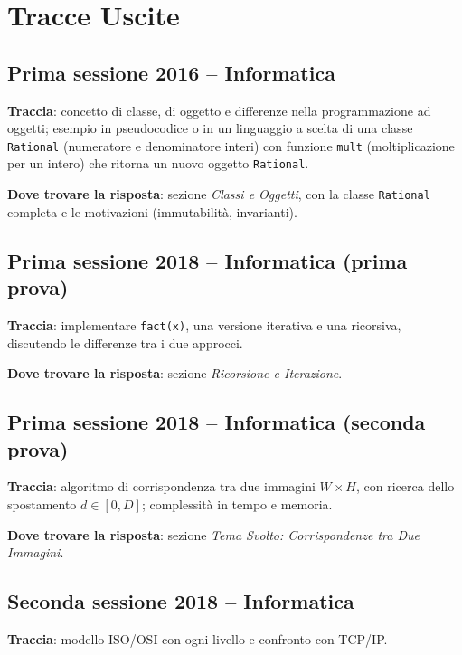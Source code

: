 
\section*{Tracce Uscite} %

\subsection*{Prima sessione 2016 -- Informatica}
\textbf{Traccia}: concetto di classe, di oggetto e differenze nella programmazione ad oggetti; esempio in pseudocodice o in un linguaggio a scelta di una classe \texttt{Rational} (numeratore e denominatore interi) con funzione \texttt{mult} (moltiplicazione per un intero) che ritorna un nuovo oggetto \texttt{Rational}.

\textbf{Dove trovare la risposta}: sezione \emph{Classi e Oggetti}, con la classe \texttt{Rational} completa e le motivazioni (immutabilità, invarianti).

\subsection*{Prima sessione 2018 -- Informatica (prima prova)}
\textbf{Traccia}: implementare \texttt{fact(x)}, una versione iterativa e una ricorsiva, discutendo le differenze tra i due approcci.

\textbf{Dove trovare la risposta}: sezione \emph{Ricorsione e Iterazione}.

\subsection*{Prima sessione 2018 -- Informatica (seconda prova)}
\textbf{Traccia}: algoritmo di corrispondenza tra due immagini $W\times H$, con ricerca dello spostamento $d \in [0, D]$; complessità in tempo e memoria.

\textbf{Dove trovare la risposta}: sezione \emph{Tema Svolto: Corrispondenze tra Due Immagini}.

\subsection*{Seconda sessione 2018 -- Informatica}
\textbf{Traccia}: modello ISO/OSI con ogni livello e confronto con TCP/IP.

